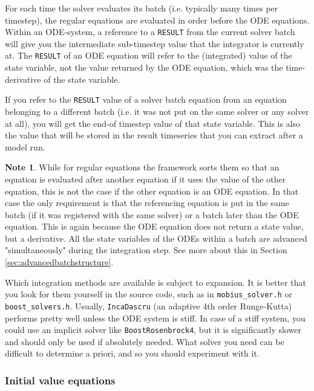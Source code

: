 \documentclass[11pt]{article}
\theoremstyle{definition}
\newtheorem{mynote}{Note}
\newenvironment{note}%
  {\begin{lrbox}{\notebox}%
   \begin{minipage}{\dimexpr\linewidth-2\fboxsep}
   \begin{mynote}}%
  {\end{mynote}%
   \end{minipage}%
   \end{lrbox}%
   \begin{trivlist}
     \item[]\colorbox{silver}{\usebox\notebox}
   \end{trivlist}}
\begin{document}
For each time the solver evaluates its batch (i.e. typically many times per timestep), the regular equations are evaluated in order before the ODE equations. Within an ODE-system, a reference to a {\tt RESULT} from the current solver batch will give you the intermediate sub-timestep value that the integrator is currently at. The {\tt RESULT} of an ODE equation will refer to the (integrated) value of the state variable, not the value returned by the ODE equation, which was the time-derivative of the state variable.

If you refer to the {\tt RESULT} value of a solver batch equation from an equation belonging to a different batch (i.e. it was not put on the same solver or any solver at all), you will get the end-of timestep value of that state variable. This is also the value that will be stored in the result timeseries that you can extract after a model run.

\begin{note}
While for regular equations the framework sorts them so that an equation is evaluated after another equation if it uses the value of the other equation, this is not the case if the other equation is an ODE equation. In that case the only requirement is that the referencing equation is put in the same batch (if it was registered with the same solver) or a batch later than the ODE equation. This is again because the ODE equation does not return a state value, but a derivative. All the state variables of the ODEs within a batch are advanced "simultaneously" during the integration step. See more about this in Section \ref{sec:advancedbatchstructure}.
\end{note}

Which integration methods are available is subject to expansion. It is better that you look for them yourself in the source code, such as in {\tt mobius\_solver.h} or {\tt boost\_solvers.h}. Usually, {\tt IncaDascru} (an adaptive 4th order Runge-Kutta) performs pretty well unless the ODE system is stiff. In case of a stiff system, you could use an implicit solver like {\tt BoostRosenbrock4}, but it is significantly slower and should only be used if absolutely needed. What solver you need can be difficult to determine a priori, and so you should experiment with it.

\subsubsection{Initial value equations}
\end{document}
